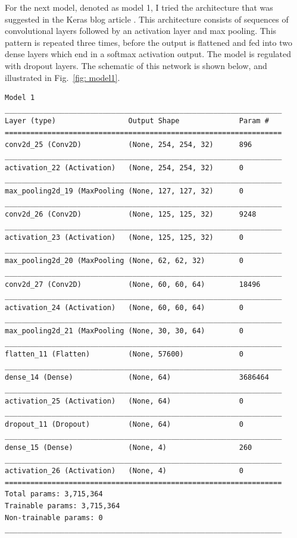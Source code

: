 \documentclass[10pt,a4paper]{article}
\begin{document}
For the next model, denoted as model 1, I tried the architecture that was suggested in the Keras blog article \cite{Chollet_2016}. This architecture consists of sequences of convolutional layers followed by an activation layer and max pooling. This pattern is repeated three times, before the output is flattened and fed into two dense layers which end in a softmax activation output. The model is regulated with dropout layers. The schematic of this network is shown below, and illustrated in Fig.~\ref{fig: model1}.


\newpage
\begin{lstlisting}
Model 1
_________________________________________________________________
Layer (type)                 Output Shape              Param #   
=================================================================
conv2d_25 (Conv2D)           (None, 254, 254, 32)      896       
_________________________________________________________________
activation_22 (Activation)   (None, 254, 254, 32)      0         
_________________________________________________________________
max_pooling2d_19 (MaxPooling (None, 127, 127, 32)      0         
_________________________________________________________________
conv2d_26 (Conv2D)           (None, 125, 125, 32)      9248      
_________________________________________________________________
activation_23 (Activation)   (None, 125, 125, 32)      0         
_________________________________________________________________
max_pooling2d_20 (MaxPooling (None, 62, 62, 32)        0         
_________________________________________________________________
conv2d_27 (Conv2D)           (None, 60, 60, 64)        18496     
_________________________________________________________________
activation_24 (Activation)   (None, 60, 60, 64)        0         
_________________________________________________________________
max_pooling2d_21 (MaxPooling (None, 30, 30, 64)        0         
_________________________________________________________________
flatten_11 (Flatten)         (None, 57600)             0         
_________________________________________________________________
dense_14 (Dense)             (None, 64)                3686464   
_________________________________________________________________
activation_25 (Activation)   (None, 64)                0         
_________________________________________________________________
dropout_11 (Dropout)         (None, 64)                0         
_________________________________________________________________
dense_15 (Dense)             (None, 4)                 260       
_________________________________________________________________
activation_26 (Activation)   (None, 4)                 0         
=================================================================
Total params: 3,715,364
Trainable params: 3,715,364
Non-trainable params: 0
_________________________________________________________________
\end{lstlisting}
\end{document}
